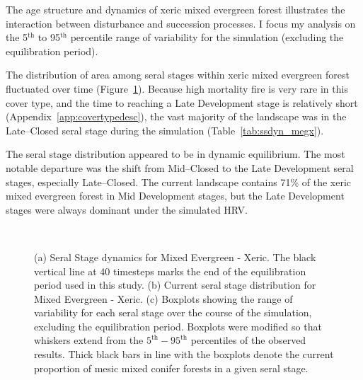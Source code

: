 The age structure and dynamics of xeric mixed evergreen forest illustrates the interaction between disturbance and succession processes. I focus my analysis on the 5$^{\text{th}}$ to 95$^{\text{th}}$ percentile range of variability for the simulation (excluding the equilibration period). %

The distribution of area among seral stages within xeric mixed evergreen forest fluctuated over time (Figure~\ref{fig:covcond_megx}). Because high mortality fire is very rare in this cover type, and the time to reaching a Late Development stage is relatively short (Appendix~\ref{app:covertypedesc}), the vast majority of the landscape was in the Late--Closed seral stage during the simulation (Table~\ref{tab:ssdyn_megx}).  %

The seral stage distribution appeared to be in dynamic equilibrium. The most notable departure was the shift from Mid--Closed to the Late Development seral stages, especially Late--Closed. The current landscape contains 71\% of the xeric mixed evergreen forest in Mid Development stages, but the Late Development stages were always dominant under the simulated HRV. 

\begin{figure}[!htbp]
  \centering
  \\
  \caption{(a) Seral Stage dynamics for Mixed Evergreen - Xeric. The black vertical line at 40 timesteps marks the end of the equilibration period used in this study. (b) Current seral stage distribution for Mixed Evergreen - Xeric. (c) Boxplots showing the range of variability for each seral stage over the course of the simulation, excluding the equilibration period. Boxplots were modified so that whiskers extend from the $5^{\text{th}} - 95^{\text{th}}$ percentiles of the observed results. Thick black bars in line with the boxplots denote the current proportion of mesic mixed conifer forests in a given seral stage.} 
  \label{fig:covcond_megx}
\end{figure}

